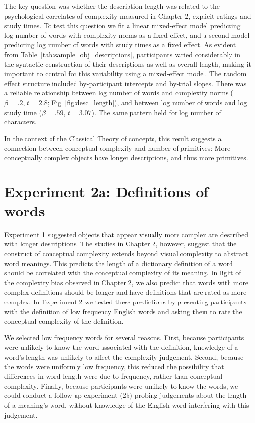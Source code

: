 The key question was whether the description length was related to the psychological correlates of complexity measured in Chapter 2, explicit ratings and study times.
To test this question we fit a  linear mixed-effect model predicting log number of words with complexity norms as a fixed effect, and a second model predicting log number of words with study times as a fixed effect. As evident from Table~\ref{tab:sample_obj_descriptions}, participants varied considerably in the  syntactic construction of their descriptions as well as overall  length, making it important to control for this variability using a  mixed-effect model. The random effect structure included by-participant intercepts and by-trial slopes. There was a reliable relationship between log number of words and  complexity norms ($\beta=.2$, $t =2.8$; Fig~\ref{fig:desc_length}), and between log number of words and log study time ($\beta=.59$, $t =3.07$). The same pattern held for log number of characters. 

In the context of the Classical Theory of concepts, this result suggests a connection between conceptual complexity and number of primitives: More conceptually complex objects have longer descriptions, and thus more primitives. 

\section{Experiment 2a: Definitions of words}
Experiment 1 suggested objects that appear visually more complex are described with longer descriptions. The studies in Chapter 2, however, suggest that the construct of conceptual complexity extends beyond visual complexity to abstract word meanings. This predicts the length of a dictionary definition of a word should be correlated with the conceptual complexity of its meaning. In light of the complexity bias observed in Chapter 2, we also predict that words with more complex definitions should be longer and have definitions that are rated as more complex. In Experiment 2 we tested these predictions by presenting participants with the definition of low frequency English words  and asking them to rate the conceptual complexity of the definition.

We selected low frequency words for several reasons. First, because participants were unlikely to know the word associated with the definition, knowledge of a word's length was unlikely to affect the complexity judgement. Second, because the words were uniformly low frequency, this reduced the possibility that differences in word length were due to frequency, rather than conceptual complexity. Finally, because participants were unlikely to know the words, we could conduct a follow-up experiment (2b) probing judgements about the length of a meaning's word, without knowledge of the English word interfering with this judgement.

